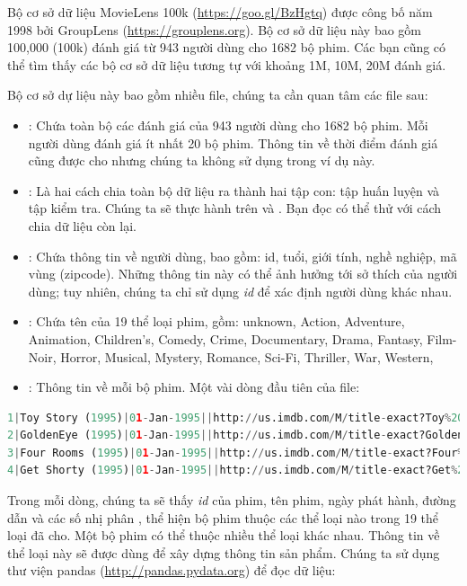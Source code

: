 Bộ cơ sở dữ liệu MovieLens 100k (\url{https://goo.gl/BzHgtq}) được công bố năm
1998 bởi {GroupLens} (\url{https://grouplens.org}). Bộ cơ sở dữ liệu này bao gồm
100,000 (100k) đánh giá từ 943 người dùng cho 1682 bộ phim. Các bạn
cũng có
thể tìm thấy các bộ cơ sở dữ liệu tương tự với khoảng 1M, 10M, 20M đánh giá.
 
Bộ cơ sở dự liệu này bao gồm nhiều file, chúng
ta cần quan tâm các file sau:
\begin{itemize}
\item {}: Chứa toàn bộ các đánh giá của 943 người dùng
cho 1682 bộ phim. Mỗi người dùng đánh giá ít nhất 20 bộ phim. Thông tin
về thời điểm đánh giá cũng được cho nhưng chúng ta không sử dụng trong ví dụ
này.
 
\item {}: Là hai cách chia toàn
bộ dữ liệu ra thành hai tập con: tập huấn luyện và tập kiểm tra. Chúng ta
sẽ thực hành trên  và . Bạn đọc có thể thử với cách chia dữ liệu còn lại.
 
\item {}: Chứa thông tin về người dùng, bao gồm: id, tuổi,
giới tính, nghề nghiệp, mã vùng (zipcode). Những thông tin này có thể
ảnh hưởng tới sở thích của người dùng; tuy nhiên, chúng
ta chỉ sử dụng \textit{id} để xác định người dùng khác nhau.
 
\item {}: Chứa tên của 19 thể loại phim, gồm: {unknown, Action, Adventure, Animation, Children's, Comedy, Crime, Documentary, Drama, Fantasy, Film-Noir, Horror, Musical, Mystery, Romance, Sci-Fi, Thriller, War, Western,} 
 
\item {}: Thông tin về mỗi bộ phim. Một vài dòng đầu tiên của file: 
\end{itemize}
\begin{lstlisting}[language=Python]
1|Toy Story (1995)|01-Jan-1995||http://us.imdb.com/M/title-exact?Toy%20Story%20(1995)|0|0|0|1|1|1|0|0|0|0|0|0|0|0|0|0|0|0|0 
2|GoldenEye (1995)|01-Jan-1995||http://us.imdb.com/M/title-exact?GoldenEye%20(1995)|0|1|1|0|0|0|0|0|0|0|0|0|0|0|0|0|1|0|0 
3|Four Rooms (1995)|01-Jan-1995||http://us.imdb.com/M/title-exact?Four%20Rooms%20(1995)|0|0|0|0|0|0|0|0|0|0|0|0|0|0|0|0|1|0|0 
4|Get Shorty (1995)|01-Jan-1995||http://us.imdb.com/M/title-exact?Get%20Shorty%20(1995)|0|1|0|0|0|1|0|0|1|0|0|0|0|0|0|0|0|0|0 
\end{lstlisting}
Trong mỗi dòng, chúng ta sẽ thấy \textit{id} của phim, tên phim, ngày phát hành, đường dẫn và các số nhị phân ,  thể hiện bộ phim thuộc các thể loại nào trong 19 thể loại đã cho. Một bộ phim có thể thuộc nhiều thể loại khác nhau. Thông tin về thể loại này sẽ được dùng để xây dựng thông tin sản phẩm.
\newpage  
Chúng ta sử dụng thư viện
pandas (\url{http://pandas.pydata.org}) để đọc dữ liệu:

